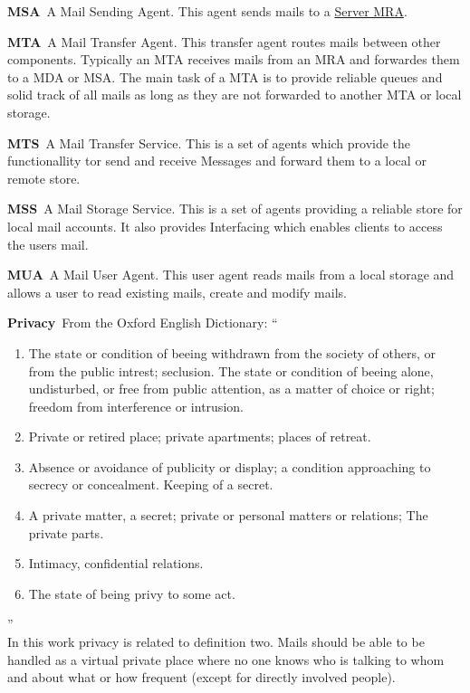 \documentclass[10pt,a4paper]{book}
\newenvironment{entry}{\par\leavevmode\hangpara{1.5mm}{1}\ignorespaces}{\RaggedRight\par}
\newcommand*{\mainentry}[2]{{\bfseries{#1\label{def:#1}}}~#2\par}
\newcommand*{\defref}[1]{\hyperref[def:#1]{#1}}
\begin{document}
\begin{appendices}
\begin{entry}
  \mainentry{MSA}{A Mail Sending Agent. This agent sends mails to a \defref{Server MRA}. }
\end{entry}

\begin{entry}
  \mainentry{MTA}{A Mail Transfer Agent. This transfer agent routes mails between other components. Typically  an MTA receives mails from an MRA and forwardes them to a MDA or MSA. The main task of a MTA is to provide reliable queues and solid track of all mails as long as they are not forwarded to another MTA or local storage.}
\end{entry}

\begin{entry}
  \mainentry{MTS}{A Mail Transfer Service. This is a set of agents which provide the functionallity tor send and receive Messages and forward them to a local or remote store.}
\end{entry}

\begin{entry}
  \mainentry{MSS}{A Mail Storage Service. This is a set of agents providing a reliable store for local mail accounts. It also provides Interfacing which enables clients to access the users mail.}
\end{entry}

\begin{entry}
  \mainentry{MUA}{A Mail User Agent. This user agent reads mails from a local storage and allows a user to read existing mails, create and modify mails.}
\end{entry}

\begin{entry}
  \mainentry{Privacy}{From the Oxford English Dictionary: ``
    \begin{enumerate}
      \item The state or condition of beeing withdrawn from the society of others, or from the public intrest; seclusion. The state or condition of beeing alone, undisturbed, or free from public attention, as a matter of choice or right; freedom from interference or intrusion.
      \item Private or retired place; private apartments; places of retreat.
      \item Absence or avoidance of publicity or display; a condition approaching to secrecy or concealment. Keeping of a secret.
      \item A private matter, a secret; private or personal matters or relations; The private parts.
      \item Intimacy, confidential relations.
      \item The state of being privy to some act.
    \end{enumerate}''\cite[FIXME]{OXFORD}\\
    In this work privacy is related to definition two. Mails should be able to be handled as a virtual private place where no one knows who is talking to whom and about what or how frequent (except for directly involved people).
  }
\end{entry}


\end{appendices}
\end{document}
